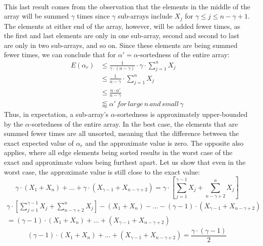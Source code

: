 \documentclass{article}
\begin{document}
\paragraph{}This last result comes from the observation that the elements in the middle of the array will be summed $\gamma$ times since $\gamma$ sub-arrays include $X_{j}$ for $\gamma \leq j \leq n - \gamma + 1$. 
The elements at either end of the array, however, will be added fewer times, as the first and last elements are only in one sub-array, second and second to last are only in two sub-arrays, and so on. Since these elements are being summed fewer times, we can conclude that for $\alpha'=\alpha$-sortedness of the entire array:
\begin{align*}
E(\alpha_{r}) & \leq \frac{1}{\gamma \cdot (n - \gamma)} \cdot \gamma \cdot \sum_{j = 1}^{n} X_{j} \\
& \leq \frac{1}{n - \gamma} \cdot \sum_{j = 1}^{n} X_{j} \\
& \leq \frac{n \cdot \alpha'}{n - \gamma} \\
& \lessapprox \alpha' \, for\, large\, n \, and\, small\, \gamma
\end{align*}
Thus, in expectation, a sub-array's $\alpha$-sortedness is approximately upper-bounded by the $\alpha$-sortedness of the entire array. In the best case, the elements that are summed fewer times are all unsorted, meaning that the difference between the exact expected value of $\alpha_{r}$ and the approximate value is zero.
The opposite also applies, where all edge elements being sorted results in the worst case of the exact and approximate values being furthest apart. Let us show that even in the worst case, the approximate value is still close to the exact value:
\begin{equation*}
\gamma \cdot (X_{1} + X_{n}) + ... + \gamma \cdot (X_{\gamma - 1} + X_{n - \gamma + 2}) = \gamma \cdot \left[ \sum_{j = 1}^{\gamma - 1} X_{j} + \sum_{n - \gamma + 2}^{n} X_{j}  \right]
\end{equation*}
\begin{multline*}
\gamma \cdot \left[ \sum_{j = 1}^{\gamma - 1} X_{j} + \sum_{n - \gamma + 2}^{n} X_{j}  \right] - (X_{1} + X_{n}) - ... - (\gamma - 1) \cdot (X_{\gamma - 1} + X_{n - \gamma + 2}) \\
= (\gamma - 1) \cdot (X_{1} + X_{n}) + ... + (X_{\gamma - 1} + X_{n - \gamma + 2})
\end{multline*}
\begin{equation*}
(\gamma - 1) \cdot (X_{1} + X_{n}) + ... + (X_{\gamma - 1} + X_{n - \gamma + 2}) = \frac{\gamma \cdot (\gamma - 1)}{2}
\end{equation*}
\end{document}
